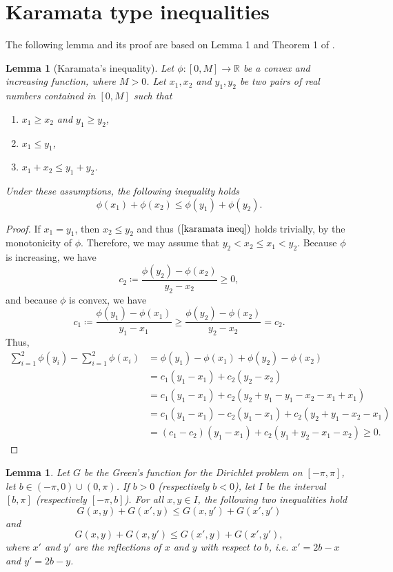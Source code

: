 \documentclass[11pt]{amsart}
\newtheorem{lemma}[theorem]{Lemma}
\numberwithin{equation}{section}
\begin{document}
\section{Karamata type inequalities}
The following lemma and its proof are based on Lemma 1 and Theorem 1 of \cite{Karamata}.
\begin{lemma}[Karamata's inequality]\label{karamata}
Let \(\phi:[0,M]\to\mathbf{\mathbb{R}}\) be a convex and increasing function, where \(M>0\). Let \(x_1,x_2\) and \(y_1,y_2\) be two pairs of real numbers contained in \([0,M]\) such that
\begin{enumerate}
    \item[(a)] \(x_1\geq x_2\) and \(y_1\geq y_2\),
    \item[(b)] \(x_1\leq y_1\),
    \item[(c)] \(x_1+x_2\leq y_1+y_2\).
\end{enumerate}
Under these assumptions, the following inequality holds
\begin{equation}\label{karamata ineq}
\phi(x_1)+\phi(x_2)\leq\phi(y_1)+\phi(y_2).
\end{equation}
\end{lemma}
\begin{proof}
If \(x_1=y_1\), then \(x_2\leq y_2\) and thus \((\ref{karamata ineq})\) holds trivially, by the monotonicity of \(\phi.\) Therefore, we may assume that \(y_2<x_2\leq x_1<y_2\). Because \(\phi\) is increasing, we have
\[c_2\coloneqq\frac{\phi(y_2)-\phi(x_2)}{y_2-x_2}\geq0,\]
and because \(\phi\) is convex, we have
\[c_1\coloneqq\frac{\phi(y_1)-\phi(x_1)}{y_1-x_1}\geq\frac{\phi(y_2)-\phi(x_2)}{y_2-x_2}=c_2.\]
Thus,
\begin{align*}
\sum_{i=1}^2\phi(y_i)-\sum_{i=1}^2\phi(x_i)&=\phi(y_1)-\phi(x_1)+\phi(y_2)-\phi(x_2)\\
&=c_1(y_1-x_1)+c_2(y_2-x_2)\\
&=c_1(y_1-x_1)+c_2(y_2+y_1-y_1-x_2-x_1+x_1)\\
&=c_1(y_1-x_1)-c_2(y_1-x_1)+c_2(y_2+y_1-x_2-x_1)\\
&=(c_1-c_2)(y_1-x_1)+c_2(y_1+y_2-x_1-x_2)\geq0.
\end{align*}
\end{proof}
\begin{lemma}\label{karamata green}
Let \(G\) be the Green's function for the Dirichlet problem on \([-\pi,\pi]\), let \(b\in(-\pi,0)\cup(0,\pi)\). If \(b>0\) (respectively \(b<0\)), let \(I\) be the interval \([b,\pi]\) (respectively \([-\pi,b]\)). For all \(x,y\in I\), the following two inequalities hold
\begin{equation}\label{4.2}
G(x,y)+G(x',y)\leq G(x,y')+G(x',y')
\end{equation}
and
\begin{equation}\label{4.3}
G(x,y)+G(x,y')\leq G(x',y)+G(x',y'),
\end{equation}
where \(x'\) and \(y'\) are the reflections of \(x\) and \(y\) with respect to \(b\), i.e. \(x'=2b-x\) and \(y'=2b-y\).\\
\end{lemma}
\end{document}
